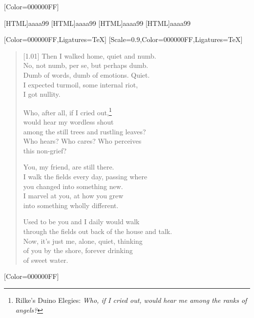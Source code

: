 \renewfontfamily{}[Color=000000FF]

[HTML]{aaaa99}
[HTML]{aaaa99}
[HTML]{aaaa99}
[HTML]{aaaa99}
\begin{paracol}{2}
  \begin{leftcolumn}
[Color=000000FF,Ligatures=TeX]
\renewfontfamily{}[Scale=0.9,Color=000000FF,Ligatures=TeX]

\begin{verse}[1.01\textwidth]
Then I walked home, quiet and numb.\\
No, not numb, per se, but perhaps dumb.\\
Dumb of words, dumb of emotions. Quiet.\\
I expected turmoil, some internal riot,\\
I got nullity.

Who, after all, if I cried out,\footnote{Rilke's Duino Elegies: \emph{Who, if I cried out, would hear me among the ranks of angels?}}\\
would hear my wordless shout\\
among the still trees and rustling leaves?\\
Who hears? Who cares? Who perceives\\
this non-grief?

You, my friend, are still there.\\
I walk the fields every day, passing where\\
you changed into something new.\\
I marvel at you, at how you grew\\
into something wholly different.

Used to be you and I daily would walk\\
through the fields out back of the house and talk.\\
Now, it's just me, alone, quiet, thinking\\
of you by the shore, forever drinking\\
of sweet water.
\end{verse}
\newpage
\end{leftcolumn}
\end{paracol}


\renewfontfamily{}[Color=000000FF]


